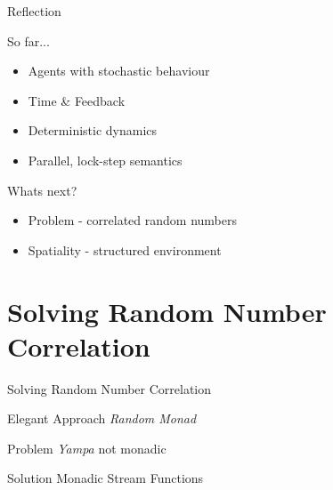 \documentclass{beamer}
\begin{document}
\begin{frame}{Reflection}
  \begin{block}{So far...}
  \begin{itemize}
    \item Agents with stochastic behaviour %
	\item Time \& Feedback %
	\item Deterministic dynamics %
	\item Parallel, lock-step semantics
  \end{itemize}
  \end{block}
    
  \begin{block}{Whats next?}
    \begin{itemize}
  	  \item Problem - correlated random numbers
	  \item Spatiality - structured environment
	\end{itemize}
  \end{block}
\end{frame}

\section{Solving Random Number Correlation}
\begin{frame}{Solving Random Number Correlation}
  \begin{block}{Elegant Approach}
  	\textit{Random Monad}
  \end{block} 
  
  \begin{block}{Problem}
  	\textit{Yampa} not monadic
  \end{block}
  
  \begin{block}{Solution}
    Monadic Stream Functions 
  \end{block}
\end{frame}
\end{document}
